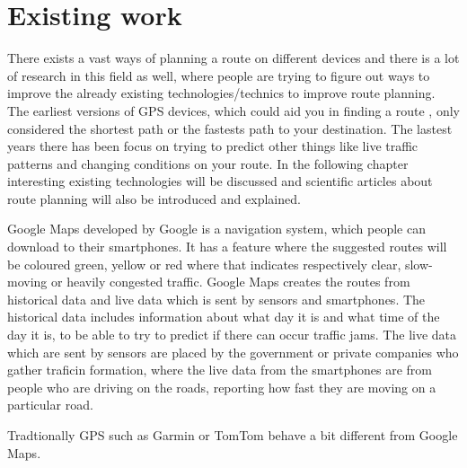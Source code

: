 \section{Existing work}
There exists a vast ways of planning a route on different devices and there is  a lot of research in this field as well, where people are trying to figure out ways to improve the already existing technologies/technics to improve route planning. The earliest versions of GPS devices, which could aid you in finding a route , only considered the shortest path or the fastests path to your destination. 
The lastest years there has been focus on trying to predict other things like live traffic patterns and changing conditions on your route.
In the following chapter interesting existing technologies will be discussed and scientific articles about route planning will also be introduced and explained.

Google Maps developed by Google is a navigation system, which people can download to their smartphones. It has a feature where the suggested routes will be coloured green, yellow or red where that indicates respectively clear, slow-moving or heavily congested traffic. 
Google Maps creates the routes from historical data and live data which is sent by sensors and smartphones. The historical data includes information about what day it is and what time of the day it is, to be able to try to predict if there can occur traffic jams. The live data which are sent by sensors are placed by the government or private companies who gather traficin formation, where the live data from the smartphones are from people who are driving on the roads, reporting how fast they are moving on a particular road.

Tradtionally GPS such as Garmin or TomTom behave a bit different from Google Maps.